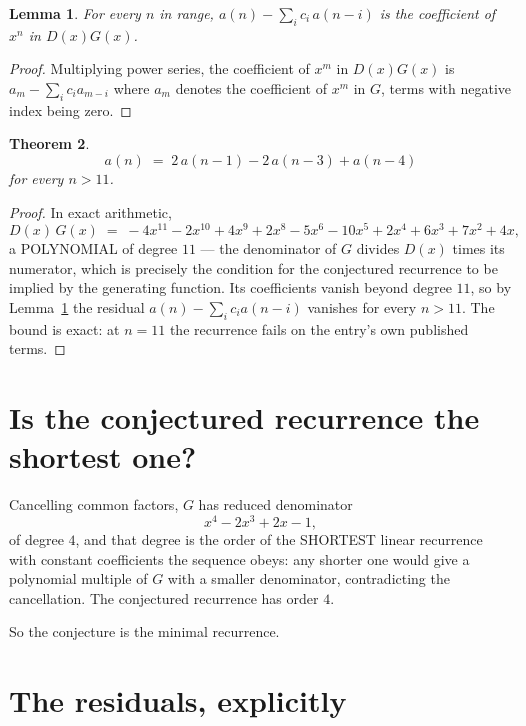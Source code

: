 \documentclass[11pt,a4paper]{article}
\theoremstyle{plain}
\newtheorem{theorem}{Theorem}
\newtheorem{lemma}[theorem]{Lemma}
\theoremstyle{definition}
\begin{document}
\begin{lemma}\label{lem:key}
For every $n$ in range, $a(n)-\sum_i c_i\,a(n-i)$ is the coefficient of $x^{n}$ in
$D(x)G(x)$.
\end{lemma}

\begin{proof}
Multiplying power series, the coefficient of $x^{m}$ in $D(x)G(x)$ is
$a_m-\sum_i c_i a_{m-i}$ where $a_m$ denotes the coefficient of $x^{m}$ in $G$, terms with
negative index being zero.
\end{proof}

\begin{theorem}
\[
a(n)\;=\;2\,a(n-1) - 2\,a(n-3) + a(n-4)
\]
for every $n>11$.
\end{theorem}

\begin{proof}
In exact arithmetic,
\[
D(x)\,G(x)\;=\;- 4 x^{11} - 2 x^{10} + 4 x^{9} + 2 x^{8} - 5 x^{6} - 10 x^{5} + 2 x^{4} + 6 x^{3} + 7 x^{2} + 4 x,
\]
a POLYNOMIAL of degree $11$ --- the denominator of $G$ divides $D(x)$ times its numerator,
which is precisely the condition for the conjectured recurrence to be implied by the
generating function. Its coefficients vanish beyond degree $11$, so by
Lemma~\ref{lem:key} the residual $a(n)-\sum_ic_ia(n-i)$ vanishes for every
$n>11$. The bound is exact: at $n=11$ the recurrence fails on the entry's own published terms.
\end{proof}

\section{Is the conjectured recurrence the shortest one?}

Cancelling common factors, $G$ has reduced denominator
\[
x^{4} - 2 x^{3} + 2 x - 1,
\]
of degree $4$, and that degree is the order of the SHORTEST linear recurrence with
constant coefficients the sequence obeys: any shorter one would give a polynomial multiple of
$G$ with a smaller denominator, contradicting the cancellation. The conjectured recurrence has
order $4$.

So the conjecture is the minimal recurrence.

\section{The residuals, explicitly}
\end{document}
